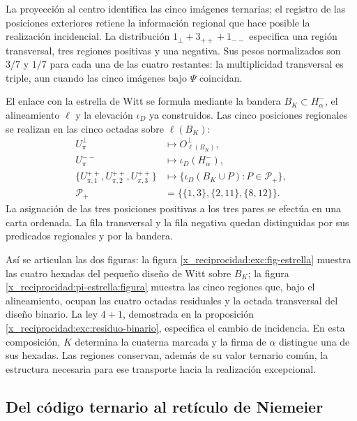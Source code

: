

La proyección al centro identifica las cinco imágenes ternarias; el
registro de las posiciones exteriores retiene la información regional
que hace posible la realización incidencial. La distribución
\(1_\perp+3_{++}+1_{--}\) especifica una región transversal, tres
regiones positivas y una negativa. Sus pesos normalizados son
\(3/7\) y \(1/7\) para cada una de las cuatro restantes: la
multiplicidad transversal es triple, aun cuando las cinco imágenes bajo
\(\Psi\) coincidan.

El enlace con la estrella de Witt se formula mediante la bandera
\(B_K\subset H^-_\alpha\), el alineamiento \(\ell\) y la
elevación \(\iota_D\) ya construidos. Las cinco posiciones regionales
se realizan en las cinco octadas sobre \(\ell(B_K)\):
\[
\begin{aligned}
 U_\pi^\perp&\longmapsto O^\perp_{\ell(B_K)},\\
 U_\pi^{--}&\longmapsto\iota_D(H^-_\alpha),\\
 \{U_{\pi,1}^{++},U_{\pi,2}^{++},U_{\pi,3}^{++}\}
 &\longmapsto
 \{\iota_D(B_K\cup P):P\in\mathcal P_+\},\\
 \mathcal P_+&=\bigl\{\{1,3\},\{2,11\},\{8,12\}\bigr\}.
\end{aligned}
\]
La asignación de las tres posiciones positivas a los tres pares se
efectúa en una carta ordenada. La fila transversal y la fila negativa
quedan distinguidas por sus predicados regionales y por la bandera.

Así se articulan las dos figuras: la figura
\ref{x_reciprocidad:exc:fig-estrella} muestra las cuatro hexadas del pequeño diseño
de Witt sobre \(B_K\); la figura \ref{x_reciprocidad:pi-estrella:figura} muestra
las cinco regiones que, bajo el alineamiento, ocupan las cuatro octadas
residuales y la octada transversal del diseño binario. La ley
\(4+1\), demostrada en la proposición
\ref{x_reciprocidad:exc:residuo-binario}, especifica el cambio de incidencia. En esta
composición, \(K\) determina la cuaterna marcada y la firma de
\(\alpha\) distingue una de sus hexadas. Las regiones conservan,
además de su valor ternario común, la estructura necesaria para ese
transporte hacia la realización excepcional.



\subsection{Del código ternario al retículo de Niemeier}
\label{x_reciprocidad:exc:niemeier}

